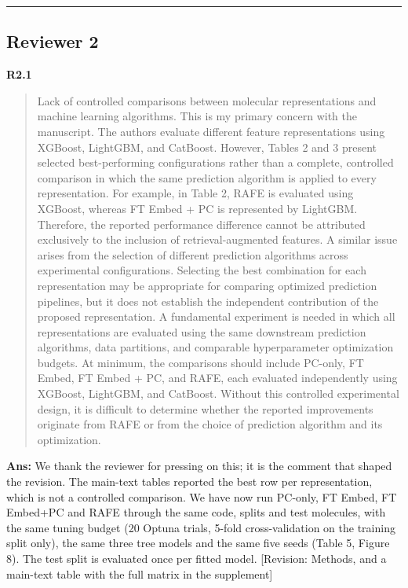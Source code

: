 \documentclass[
  10pt,
]{article}
\begin{document}
\begin{center}\rule{0.5\linewidth}{0.5pt}\end{center}

\hypertarget{reviewer-2}{%
\subsection{Reviewer 2}\label{reviewer-2}}

\textbf{R2.1}

\begin{quote}
Lack of controlled comparisons between molecular representations and
machine learning algorithms. This is my primary concern with the
manuscript. The authors evaluate different feature representations using
XGBoost, LightGBM, and CatBoost. However, Tables 2 and 3 present
selected best-performing configurations rather than a complete,
controlled comparison in which the same prediction algorithm is applied
to every representation. For example, in Table 2, RAFE is evaluated
using XGBoost, whereas FT Embed + PC is represented by LightGBM.
Therefore, the reported performance difference cannot be attributed
exclusively to the inclusion of retrieval-augmented features. A similar
issue arises from the selection of different prediction algorithms
across experimental configurations. Selecting the best combination for
each representation may be appropriate for comparing optimized
prediction pipelines, but it does not establish the independent
contribution of the proposed representation. A fundamental experiment is
needed in which all representations are evaluated using the same
downstream prediction algorithms, data partitions, and comparable
hyperparameter optimization budgets. At minimum, the comparisons should
include PC-only, FT Embed, FT Embed + PC, and RAFE, each evaluated
independently using XGBoost, LightGBM, and CatBoost. Without this
controlled experimental design, it is difficult to determine whether the
reported improvements originate from RAFE or from the choice of
prediction algorithm and its optimization.
\end{quote}

\textbf{Ans:} We thank the reviewer for pressing on this; it is the
comment that shaped the revision. The main-text tables reported the best
row per representation, which is not a controlled comparison. We have
now run PC-only, FT Embed, FT Embed+PC and RAFE through the same code,
splits and test molecules, with the same tuning budget (20 Optuna
trials, 5-fold cross-validation on the training split only), the same
three tree models and the same five seeds (Table 5, Figure 8). The test
split is evaluated once per fitted model. {[}Revision: Methods, and a
main-text table with the full matrix in the supplement{]}
\end{document}
